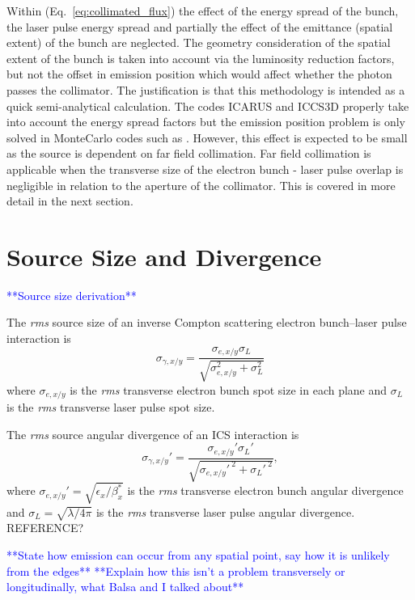 \documentclass[../main.tex]{subfiles}
\begin{document}
Within (Eq.~\ref{eq:collimated_flux}) the effect of the energy spread of the bunch, the laser pulse energy spread and partially the effect of the emittance (spatial extent) of the bunch are neglected. The geometry consideration of the spatial extent of the bunch is taken into account via the luminosity reduction factors, but not the offset in emission position which would affect whether the photon passes the collimator. The justification is that this methodology is intended as a quick semi-analytical calculation. The codes \textsc{ICARUS} and \textsc{ICCS3D} \cite{krafft2016laser,ranjan2018simulation} properly take into account the energy spread factors but the emission position problem is only solved in MonteCarlo codes such as  \cite{chen1995cain}. However, this effect is expected to be small as the source is dependent on far field collimation. Far field collimation is applicable when the transverse size of the electron bunch - laser pulse overlap is negligible in relation to the aperture of the collimator. This is covered in more detail in the next section.  

\section{Source Size and Divergence}
\textcolor{blue}{**Source size derivation**}

The \textit{rms} source size of an inverse Compton scattering electron bunch--laser pulse interaction is 
\begin{equation}
\sigma_{\gamma,x/y} = \frac{\sigma_{e,x/y}\sigma_{L}}{\sqrt{\sigma_{e,x/y}^{2}+\sigma_{L}^{2}}}
\label{eq:source_size}
\end{equation}
where $\sigma_{e,x/y}$ is the \textit{rms} transverse electron bunch spot size in each plane and $\sigma_{L}$ is the \textit{rms} transverse laser pulse spot size.  

The \textit{rms} source angular divergence of an ICS interaction is
\begin{equation}
\sigma_{\gamma,x/y}' = \frac{\sigma_{e,x/y}'\sigma_{L}'}{\sqrt{\sigma_{e,x/y}'^{~2}+\sigma_{L}'^{~2}}},
\label{eq:source_divergence}
\end{equation}
where $\sigma_{e,x/y}' = \sqrt{\epsilon_{x}/\beta_{x}^{*}}$ is the \textit{rms} transverse electron bunch angular divergence and $\sigma_{L} = \sqrt{\lambda/4\pi}$ is the \textit{rms} transverse laser pulse angular divergence. REFERENCE?


\textcolor{blue}{**State how emission can occur from any spatial point, say how it is unlikely from the edges**}
\textcolor{blue}{**Explain how this isn't a problem transversely or longitudinally, what Balsa and I talked about**}
\end{document}
